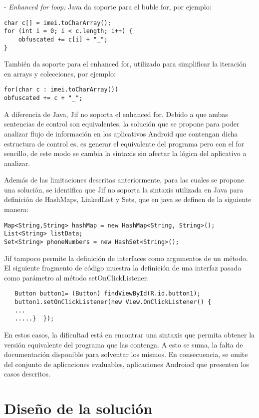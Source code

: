 - \textit{Enhanced for loop:} Java da soporte para el buble for, por ejemplo:
\begin{lstlisting}
char c[] = imei.toCharArray();
for (int i = 0; i < c.length; i++) {
	obfuscated += c[i] + "_";
}          
\end{lstlisting}  
También da soporte para el enhanced for, utilizado para simplificar la iteración
en arrays y colecciones, por ejemplo:
\begin{lstlisting}
for(char c : imei.toCharArray())
obfuscated += c + "_";
\end{lstlisting}
A diferencia de Java, Jif no soporta el enhanced for. Debido a que ambas
sentencias de control son equivalentes, la solución que se propone para poder
analizar flujo de información en los aplicativos Android que contengan dicha
estructura de control es, es generar el equivalente del programa pero con el for
sencillo, de este modo se cambia la sintaxis sin afectar la lógica del
aplicativo a analizar.

Además de las limitaciones descritas anteriormente, para las cuales se propone
una solución, se identifica que Jif no soporta la sintaxis utilizada en Java
para definición de HashMaps, LinkedList y Sets, que en java se definen de la
siguiente manera:
\begin{lstlisting}
Map<String,String> hashMap = new HashMap<String, String>();
List<String> listData;
Set<String> phoneNumbers = new HashSet<String>();
\end{lstlisting}
Jif tampoco permite la definición de interfaces como argumentos de un método. El
siguiente fragmento de código  muestra la definición de una interfaz pasada como
parámetro al método setOnClickListener.
\begin{lstlisting}
   Button button1= (Button) findViewById(R.id.button1);
   button1.setOnClickListener(new View.OnClickListener() {
   ...
   .....}  });
\end{lstlisting}
En estos casos, la dificultad está en encontrar una sintaxis que permita obtener
la versión equivalente del programa que las contenga. A esto se suma, la falta
de documentación disponible para solventar los mismos. En consecuencia, se omite
del conjunto de aplicaciones evaluables, aplicaciones Androiod que presenten los
casos descritos.\newline


\section{Diseño de la solución} 
